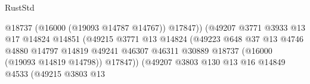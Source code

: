 \begin{lexlean}{RustStd}
\begin{coremodule}
                                                            @18737
                                                            (@16000 (@19093 @14787 @14767))
                                                            @17847))
                                                        (@49207
                                                          @3771
                                                          @3933
                                                          @13
                                                          @17
                                                          @14824
                                                          @14851
                                                          (@49215
                                                            @3771
                                                            @13
                                                            @14824
                                                            (@49223
                                                              @648
                                                              @37
                                                              @13
                                                              @4746
                                                              @4880
                                                              @14797
                                                              @14819
                                                              @49241
                                                              @46307
                                                              @46311
                                                              @30889
                                                              @18737
                                                              (@16000 (@19093 @14819 @14798))
                                                              @17847))
                                                          (@49207
                                                            @3803
                                                            @130
                                                            @13
                                                            @16
                                                            @14849
                                                            @4533
                                                            (@49215
                                                              @3803
                                                              @13

\end{coremodule}
\end{lexlean}
